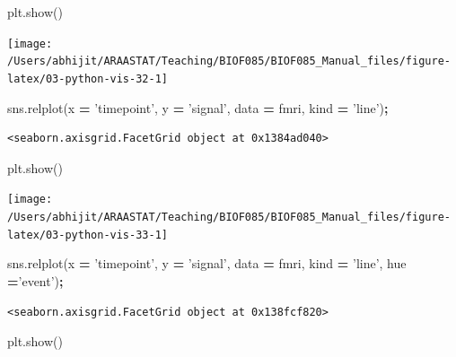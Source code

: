 \documentclass[
  letterpaper,
]{scrbook}
\newenvironment{Shaded}{\begin{snugshade}}{\end{snugshade}}
\newcommand{\NormalTok}[1]{#1}
\newcommand{\OperatorTok}[1]{\textcolor[rgb]{0.81,0.36,0.00}{\textbf{#1}}}
\newcommand{\StringTok}[1]{\textcolor[rgb]{0.31,0.60,0.02}{#1}}
\begin{document}
\begin{Shaded}
\begin{Highlighting}[]
\NormalTok{plt.show()}
\end{Highlighting}
\end{Shaded}

\begin{center}\texttt{[image: /Users/abhijit/ARAASTAT/Teaching/BIOF085/BIOF085\_Manual\_files/figure-latex/03-python-vis-32-1]} \end{center}

\begin{Shaded}
\begin{Highlighting}[]
\NormalTok{sns.relplot(x }\OperatorTok{=} \StringTok{'timepoint'}\NormalTok{, y }\OperatorTok{=} \StringTok{'signal'}\NormalTok{, data }\OperatorTok{=}\NormalTok{ fmri, kind }\OperatorTok{=} \StringTok{'line'}\NormalTok{)}\OperatorTok{;}
\end{Highlighting}
\end{Shaded}

\begin{verbatim}
<seaborn.axisgrid.FacetGrid object at 0x1384ad040>
\end{verbatim}

\begin{Shaded}
\begin{Highlighting}[]
\NormalTok{plt.show()}
\end{Highlighting}
\end{Shaded}

\begin{center}\texttt{[image: /Users/abhijit/ARAASTAT/Teaching/BIOF085/BIOF085\_Manual\_files/figure-latex/03-python-vis-33-1]} \end{center}

\begin{Shaded}
\begin{Highlighting}[]
\NormalTok{sns.relplot(x }\OperatorTok{=} \StringTok{'timepoint'}\NormalTok{, y }\OperatorTok{=} \StringTok{'signal'}\NormalTok{, data }\OperatorTok{=}\NormalTok{ fmri, kind }\OperatorTok{=} \StringTok{'line'}\NormalTok{, hue }\OperatorTok{=}\StringTok{'event'}\NormalTok{)}\OperatorTok{;}
\end{Highlighting}
\end{Shaded}

\begin{verbatim}
<seaborn.axisgrid.FacetGrid object at 0x138fcf820>
\end{verbatim}

\begin{Shaded}
\begin{Highlighting}[]
\NormalTok{plt.show()}
\end{Highlighting}
\end{Shaded}
\end{document}
